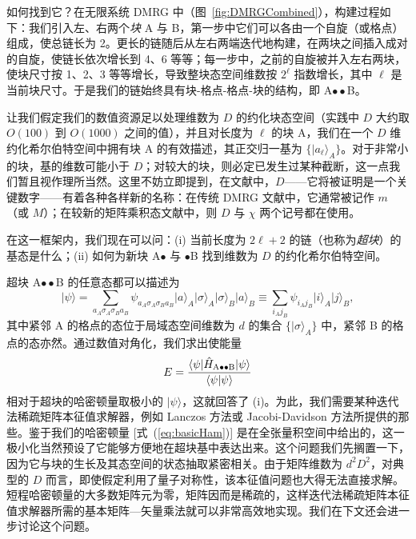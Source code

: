 \documentclass[a4paper,10pt,oneside,onecolumn,1p,times]{elsarticle}
\newcommand{\bra}[1]{\mbox{$\langle #1  |$}}
\newcommand{\ket}[1]{\mbox{$| #1  \rangle$}}
\newcommand{\braket}[2]{\mbox{$\langle #1  | #2 \rangle$}} 	%
\begin{document}
如何找到它？在无限系统 DMRG 中（图~\ref{fig:DMRGCombined}），构建过程如下：我们引入左、右两个{\em 块} A 与 B，第一步中它们可以各由一个自旋（或格点）组成，使总链长为 2。更长的链随后从左右两端迭代地构建，在两块之间插入成对的自旋，使链长依次增长到 4、6 等等；每一步中，之前的自旋被并入左右两块，使块尺寸按 1、2、3 等等增长，导致整块态空间维数按 $2^\ell$ 指数增长，其中 $\ell$ 是当前块尺寸。于是我们的链始终具有块-格点-格点-块的结构，即 A$\bullet\bullet$B。

让我们假定我们的数值资源足以处理维数为 $D$ 的约化块态空间（实践中 $D$ 大约取 $O(100)$ 到 $O(1000)$ 之间的值），并且对长度为 $\ell$ 的块 A，我们在一个 $D$ 维约化希尔伯特空间中拥有块 A 的有效描述，其正交归一基为 $\{ \ket{a_\ell}_A \}$。对于非常小的块，基的维数可能小于 $D$；对较大的块，则必定已发生过某种截断，这一点我们暂且视作理所当然。这里不妨立即提到，在文献中，$D$——它将被证明是一个关键数字——有着各种各样新的名称：在传统 DMRG 文献中，它通常被记作 $m$（或 $M$）；在较新的矩阵乘积态文献中，则 $D$ 与 $\chi$ 两个记号都在使用。

在这一框架内，我们现在可以问：(i) 当前长度为 $2\ell +2$ 的链（也称为{\em 超块}）的基态是什么；(ii) 如何为新块 A$\bullet$ 与 $\bullet$B 找到维数为 $D$ 的约化希尔伯特空间。 

超块 A$\bullet\bullet$B 的任意态都可以描述为
\begin{equation}
\ket{\psi}= \sum_{a_A \sigma_A \sigma_B a_B} \psi_{a_A \sigma_A \sigma_B a_B} \ket{a}_A \ket{\sigma}_A \ket{\sigma}_B \ket{a}_B \equiv \sum_{i_A j_B} \psi_{i_A j_B} \ket{i}_A \ket{j}_B,
\label{US:eq:DMRGstate}
\end{equation}
其中紧邻 A 的格点的态位于局域态空间维数为 $d$ 的集合 $\{ \ket{\sigma}_A \}$ 中，紧邻 B 的格点的态亦然。通过数值对角化，我们求出使能量
\begin{equation}
E = \frac{\bra{\psi} \hat{H}_{{\rm A}\bullet\bullet{\rm B}} \ket{\psi}}{\braket{\psi}{\psi}}
\end{equation}
相对于超块的哈密顿量取极小的 $\ket{\psi}$，这就回答了 (i)。为此，我们需要某种迭代法稀疏矩阵本征值求解器，例如 Lanczos 方法或 Jacobi-Davidson 方法所提供的那些。鉴于我们的哈密顿量 [式~(\ref{eq:basicHam})] 是在全张量积空间中给出的，这一极小化当然预设了它能够方便地在超块基中表达出来。这个问题我们先搁置一下，因为它与块的生长及其态空间的状态抽取紧密相关。由于矩阵维数为 $d^2 D^2$，对典型的 $D$ 而言，即使假定利用了量子对称性，该本征值问题也大得无法直接求解。短程哈密顿量的大多数矩阵元为零，矩阵因而是稀疏的，这样迭代法稀疏矩阵本征值求解器所需的基本矩阵—矢量乘法就可以非常高效地实现。我们在下文还会进一步讨论这个问题。
\end{document}
